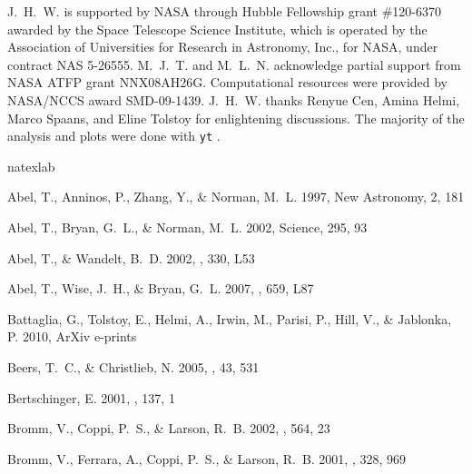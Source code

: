 \documentclass[apjl]{emulateapj}
\begin{document}
\acknowledgments

J.~H.~W. is supported by NASA through Hubble Fellowship grant
\#120-6370 awarded by the Space Telescope Science Institute, which is
operated by the Association of Universities for Research in Astronomy,
Inc., for NASA, under contract NAS 5-26555.  M.~J.~T. and
M.~L.~N. acknowledge partial support from NASA ATFP grant NNX08AH26G.
Computational resources were provided by NASA/NCCS award SMD-09-1439.
J.~H.~W. thanks Renyue Cen, Amina Helmi, Marco Spaans, and Eline
Tolstoy for enlightening discussions.  The majority of the analysis
and plots were done with \texttt{yt} \citep{yt_full_paper}.

%
%
\begin{thebibliography}{50}
\expandafter\ifx\csname natexlab\endcsname\relax\def\natexlab#1{#1}\fi

{Abel}, T., {Anninos}, P., {Zhang}, Y., \& {Norman}, M.~L. 1997, New Astronomy,
  2, 181

{Abel}, T., {Bryan}, G.~L., \& {Norman}, M.~L. 2002, Science, 295, 93

{Abel}, T., \& {Wandelt}, B.~D. 2002, \mnras, 330, L53

{Abel}, T., {Wise}, J.~H., \& {Bryan}, G.~L. 2007, \apjl, 659, L87

{Battaglia}, G., {Tolstoy}, E., {Helmi}, A., {Irwin}, M., {Parisi}, P., {Hill},
  V., \& {Jablonka}, P. 2010, ArXiv e-prints

{Beers}, T.~C., \& {Christlieb}, N. 2005, \araa, 43, 531

{Bertschinger}, E. 2001, \apjs, 137, 1

{Bromm}, V., {Coppi}, P.~S., \& {Larson}, R.~B. 2002, \apj, 564, 23

{Bromm}, V., {Ferrara}, A., {Coppi}, P.~S., \& {Larson}, R.~B. 2001, \mnras,
  328, 969


\end{thebibliography}
\end{document}
